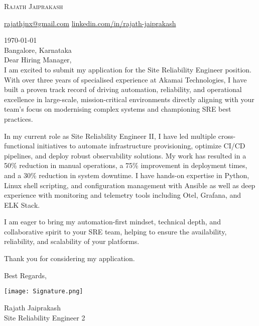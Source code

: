 \documentclass[12pt]{letter}
\begin{document}
\AddToShipoutPictureBG{%
\color{gr}
\AtPageUpperLeft{\rule[-1.3in]{\paperwidth}{1.3in}}
}

\begin{center}
{\fontsize{28}{0}\selectfont\scshape Rajath Jaiprakash}

\href{mailto:rajathjnx@gmail.com}{\faEnvelope\enspace rajathjnx@gmail.com}\hfill
\href{https://linkedin.com/in/rajath-jaiprakash}{\faLinkedinIn\enspace linkedin.com/in/rajath-jaiprakash}\hfill
\href{tel:9900852849}{\faPhone{}}
\end{center}

\vspace{0.2in}

\today\\

Bangalore, Karnataka \\

\vspace{-0.1in}Dear Hiring Manager,\\

\vspace{-0.1in}\setlength\parindent{24pt}
I am excited to submit my application for the Site Reliability Engineer position. With over three years of specialised experience at Akamai Technologies, I have built a proven track record of driving automation, reliability, and operational excellence in large-scale, mission-critical environments directly aligning with your team's focus on modernising complex systems and championing SRE best practices.

In my current role as Site Reliability Engineer II, I have led multiple cross-functional initiatives to automate infrastructure provisioning, optimize CI/CD pipelines, and deploy robust observability solutions. My work has resulted in a 50\% reduction in manual operations, a 75\% improvement in deployment times, and a 30\% reduction in system downtime. I have hands-on expertise in Python, Linux shell scripting, and configuration management with Ansible as well as deep experience with monitoring and telemetry tools including Otel, Grafana, and ELK Stack.

I am eager to bring my automation-first mindset, technical depth, and collaborative spirit to your SRE team, helping to ensure the availability, reliability, and scalability of your platforms.

Thank you for considering my application.

\vspace{0.1in}
\vfill

\begin{flushright}
Best Regards,

\vspace{-0.1in}\texttt{[image: Signature.png]}\vspace{-0.1in}

Rajath Jaiprakash\\
Site Reliability Engineer 2
\end{flushright}
\end{document}
